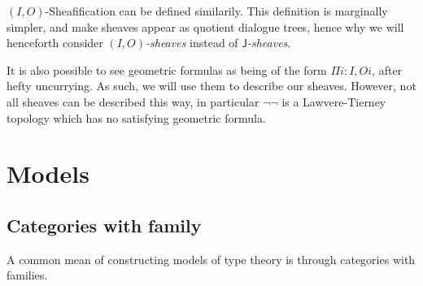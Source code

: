 \documentclass[11pt]{article}
\newcommand{\0}{\mathbf{0}}
\newcommand{\1}{\mathbf{1}}
\begin{document}
$(I,O)$-Sheafification can be defined similarily. This definition is marginally simpler, and make sheaves appear as quotient dialogue trees, hence why we will henceforth consider \emph{$(I,O)$-sheaves} instead of \emph{$\mathsf{J}$-sheaves}.

It is also possible to see geometric formulas as being of the form $\Pi i : I, O i$, after hefty uncurrying. As such, we will use them to describe our sheaves. However, not all sheaves can be described this way, in particular $\lnot\lnot$ is a Lawvere-Tierney topology which has no satisfying geometric formula.

\section{Models}\label{Models}

\subsection{Categories with family}

A common mean of constructing models of type theory is through categories with families.
\end{document}
